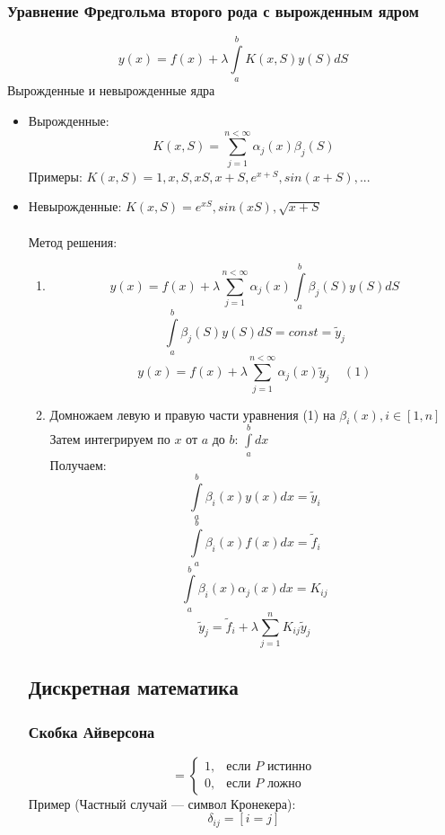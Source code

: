 \subsubsection{Уравнение Фредгольма второго рода с вырожденным ядром}
$$y(x)=f(x)+\lambda\int\limits_{a}^{b}K(x,S)y(S)dS$$
Вырожденные и невырожденные ядра
\begin{itemize}
  \item Вырожденные: $$K(x,S)=\sum\limits_{j=1}^{n<\infty}\alpha_{j}(x)\beta_{j}(S)$$
     Примеры: $K(x,S)=1,x,S,xS,x+S,e^{x+S},sin(x+S),...$
  \item Невырожденные: $K(x,S)=e^{xS},sin(xS),\sqrt{x+S}$
  \\\\
  Метод решения:
  \begin{enumerate}
      \item $$y(x)=f(x)+\lambda\sum\limits_{j=1}^{n<\infty}\alpha_{j}(x)\int\limits_{a}^{b}\beta_{j}(S)y(S)dS$$
      $$\int\limits_{a}^{b}\beta_{j}(S)y(S)dS=const=\tilde y_{j}$$
      $$y(x)=f(x)+\lambda\sum\limits_{j=1}^{n<\infty}\alpha_{j}(x)\tilde y_{j}\;\;\;\;(1)$$
      \item Домножаем левую и правую части уравнения (1) на $\beta_{i}(x),i\in [1,n]$\\
      Затем интегрируем по $x$ от $a$ до $b$: $\int\limits_{a}^{b}dx$\\
      Получаем:
      $$\int\limits_{a}^{b}\beta_{i}(x)y(x)dx=\tilde y_{i}$$
      $$\int\limits_{a}^{b}\beta_{i}(x)f(x)dx=\tilde f_{i}$$
      $$\int\limits_{a}^{b}\beta_{i}(x)\alpha_{j}(x)dx=K_{ij}$$
      $$\tilde y_{j}=\tilde f_{i} + \lambda\sum\limits_{j=1}^{n}K_{ij}\tilde y_{j}$$
  \end{enumerate}
  


\subsection{Дискретная математика}
\subsubsection{Скобка Айверсона}
\begin{equation*}
[P] = 
 \begin{cases}
   1, &\text{если $P$ истинно}\\
   0, &\text{если $P$ ложно}
 \end{cases}
\end{equation*}
Пример (Частный случай --- символ Кронекера):
$$\delta_{ij}=[i=j]$$
\end{itemize}